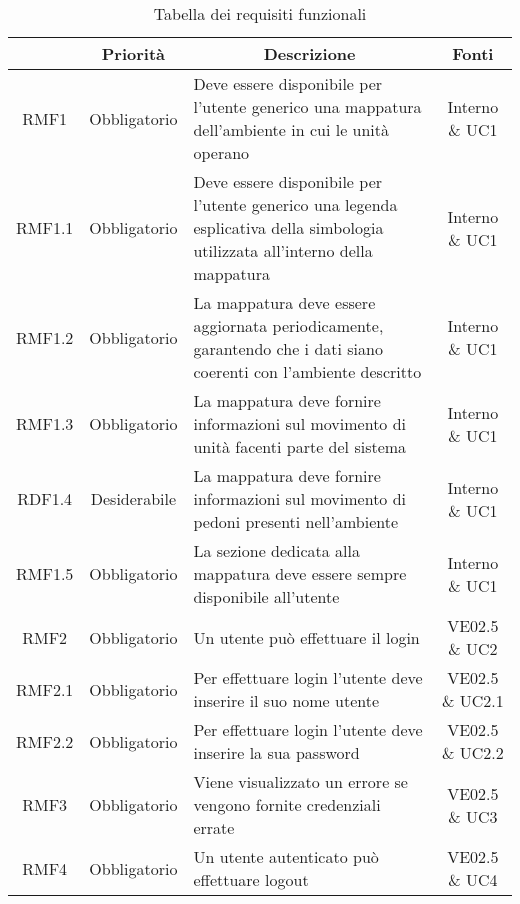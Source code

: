 	\newcommand*{\thead}[1]{\multicolumn{1}{c}{\bfseries #1}}
	\setlength{\tabcolsep}{10pt}
	\begin{longtable}[h!] { c c m{8cm} c}
		\caption{Tabella dei requisiti funzionali} \\
		\rowcolor{lightgray}
		\thead{Requisito} & \thead{Priorità} & \thead{Descrizione} & \thead{Fonti} \\ \endhead%

		RMF1 & Obbligatorio & Deve essere disponibile per l'utente generico una mappatura dell'ambiente in cui le unità operano & Interno \& UC1 \\

		RMF1.1 & Obbligatorio & Deve essere disponibile per l'utente generico una legenda esplicativa della simbologia utilizzata all'interno della mappatura & Interno \& UC1 \\

		RMF1.2 & Obbligatorio & La mappatura deve essere aggiornata periodicamente, garantendo che i dati siano coerenti con l'ambiente descritto & Interno \& UC1 \\

		RMF1.3 & Obbligatorio & La mappatura deve fornire informazioni sul movimento di unità facenti parte del sistema & Interno \& UC1 \\

		RDF1.4 & Desiderabile & La mappatura deve fornire informazioni sul movimento di pedoni presenti nell'ambiente & Interno \& UC1 \\

		RMF1.5 & Obbligatorio & La sezione dedicata alla mappatura deve essere sempre disponibile all'utente & Interno \& UC1 \\

		RMF2 & Obbligatorio & Un utente può effettuare il login & VE02.5 \& UC2 \\

		RMF2.1 & Obbligatorio & Per effettuare login l'utente deve inserire il suo nome utente & VE02.5 \& UC2.1 \\

		RMF2.2 & Obbligatorio & Per effettuare login l'utente deve inserire la sua password & VE02.5 \& UC2.2 \\

		RMF3 & Obbligatorio & Viene visualizzato un errore se vengono fornite credenziali errate & VE02.5 \& UC3 \\

		RMF4 & Obbligatorio & Un utente autenticato può effettuare logout & VE02.5 \& UC4 \\


\end{longtable}
